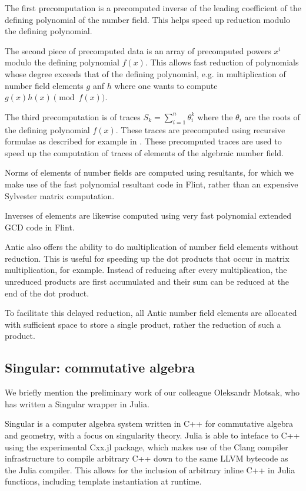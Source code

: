 \documentclass{sig-alternate-05-2015}
\begin{document}
The first precomputation is a precomputed inverse of the leading coefficient of the defining
polynomial of the number field. This helps speed up reduction modulo the defining polynomial.

The second piece of precomputed data is an array of precomputed powers $x^i$ modulo the
defining polynomial $f(x)$. This allows fast reduction of polynomials whose degree exceeds
that of the defining polynomial, e.g. in multiplication of number field elements $g$ anf $h$
where one wants to compute $g(x)h(x) \pmod{f(x)}$.

The third precomputation is of traces $S_k = \sum_{i=1}^n \theta_i^k$ where the $\theta_i$
are the roots of the defining polynomial $f(x)$. These traces are precomputed using
recursive formulae as described for example in \cite{cohen}. These precomputed traces are
used to speed up the computation of traces of elements of the algebraic number field.

Norms of elements of number fields are computed using resultants, for which we make use of
the fast polynomial resultant code in Flint, rather than an expensive Sylvester matrix
computation.

Inverses of elements are likewise computed using very fast polynomial extended GCD code in
Flint.

Antic also offers the ability to do multiplication of number field elements without
reduction. This is useful for speeding up the dot products that occur in matrix
multiplication, for example. Instead of reducing after every multiplication, the unreduced
products are first accumulated and their sum can be reduced at the end of the dot product.

To facilitate this delayed reduction, all Antic number field elements are allocated with
sufficient space to store a single product, rather the reduction of such a product.

\subsection{Singular: commutative algebra}

We briefly mention the preliminary work of our colleague Oleksandr Motsak, who has written
a Singular wrapper in Julia.

Singular \cite{singular} is a computer algebra system written in C++ for commutative algebra
and geometry, with a focus on singularity theory. Julia is able to inteface to C++ using
the experimental Cxx.jl package, which makes use of the Clang compiler infrastructure to
compile arbitrary C++ down to the same LLVM bytecode as the Julia compiler. This allows
for the inclusion of arbitrary inline C++ in Julia functions, including template 
instantiation at runtime.
\end{document}
